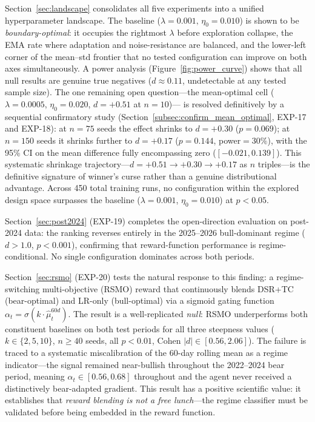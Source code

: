 \documentclass[conference]{IEEEtran}
\begin{document}
Section~\ref{sec:landscape} consolidates all five experiments into
a unified hyperparameter landscape. The baseline
($\lambda=0.001,\,\eta_0=0.010$) is shown to be
\emph{boundary-optimal}: it occupies the rightmost $\lambda$
before exploration collapse, the EMA rate where adaptation
and noise-resistance are balanced, and the lower-left
corner of the mean--std frontier that no tested configuration
can improve on both axes simultaneously. A power analysis (Figure~\ref{fig:power_curve}) shows that
all null results are genuine true negatives
($d \approx 0.11$, undetectable at any tested sample size).
The one remaining open question---the mean-optimal cell
($\lambda=0.0005$, $\eta_0=0.020$, $d=+0.51$ at $n=10$)---
is resolved definitively by a sequential confirmatory study
(Section~\ref{subsec:confirm_mean_optimal}, EXP-17 and EXP-18):
at $n=75$ seeds the effect shrinks to $d=+0.30$ ($p=0.069$);
at $n=150$ seeds it shrinks further to $d=+0.17$ ($p=0.144$,
power$=30\%$), with the 95\% CI on the mean difference
fully encompassing zero ($[-0.021, 0.139]$).
This systematic shrinkage trajectory---$d=+0.51 \to +0.30
\to +0.17$ as $n$ triples---is the definitive signature
of winner's curse rather than a genuine distributional
advantage. Across 450 total training runs, no configuration
within the explored design space surpasses the baseline
($\lambda=0.001$, $\eta_0=0.010$) at $p<0.05$.

Section~\ref{sec:post2024} (EXP-19) completes the
open-direction evaluation on post-2024 data:
the ranking reverses entirely in the 2025--2026
bull-dominant regime ($d>1.0$, $p<0.001$), confirming
that reward-function performance is regime-conditional.
No single configuration dominates across both periods.

Section~\ref{sec:rsmo} (EXP-20) tests the natural response to this
finding: a regime-switching multi-objective (RSMO) reward that
continuously blends DSR+TC (bear-optimal) and LR-only (bull-optimal)
via a sigmoid gating function $\alpha_t = \sigma(k \cdot
\hat{\mu}^{60d}_t)$. The result is a well-replicated \emph{null}:
RSMO underperforms both constituent baselines on both test periods
for all three steepness values ($k \in \{2,5,10\}$, $n \geq 40$ seeds,
all $p<0.01$, Cohen $|d| \in [0.56, 2.06]$). The failure is traced to
a systematic miscalibration of the 60-day rolling mean as a regime
indicator---the signal remained near-bullish throughout the 2022--2024
bear period, meaning $\alpha_t \in [0.56, 0.68]$ throughout and the
agent never received a distinctively bear-adapted gradient. This
result has a positive scientific value: it establishes that
\emph{reward blending is not a free lunch}---the regime classifier
must be validated before being embedded in the reward function.
\end{document}
